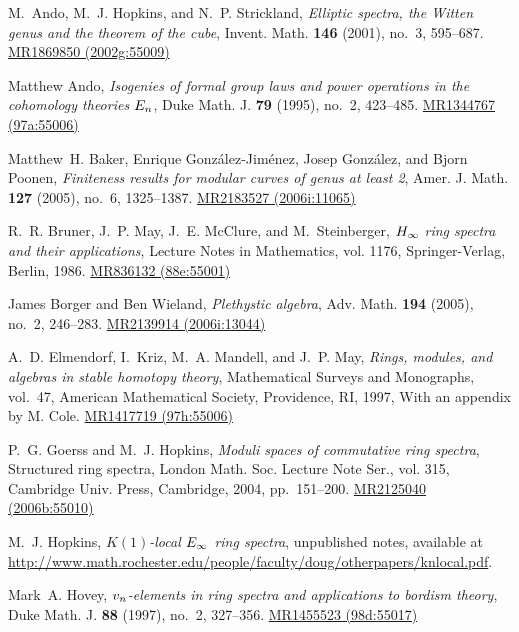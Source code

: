 \documentclass{gtpart}
\theoremstyle{definition}
\theoremstyle{remark}
\begin{document}
\newcommand{\MRn}[2]{\href{http://www.ams.org/mathscinet-getitem?mr=#1}{MR#1 #2}}
\begin{thebibliography}

M.~Ando, M.~J. Hopkins, and N.~P. Strickland, \emph{Elliptic spectra, the
  {W}itten genus and the theorem of the cube}, Invent. Math. \textbf{146}
  (2001), no.~3, 595--687. \MRn{1869850}{(2002g:55009)}

Matthew Ando, \emph{Isogenies of formal group laws and power operations in the
  cohomology theories {$E\sb n$}}, Duke Math. J. \textbf{79} (1995), no.~2,
  423--485. \MRn{1344767}{(97a:55006)}

Matthew~H. Baker, Enrique Gonz{\'a}lez-Jim{\'e}nez, Josep Gonz{\'a}lez, and
  Bjorn Poonen, \emph{Finiteness results for modular curves of genus at least
  2}, Amer. J. Math. \textbf{127} (2005), no.~6, 1325--1387. \MRn{2183527}{(2006i:11065)}

R.~R. Bruner, J.~P. May, J.~E. McClure, and M.~Steinberger, \emph{{$H\sb \infty
  $} ring spectra and their applications}, Lecture Notes in Mathematics, vol.
  1176, Springer-Verlag, Berlin, 1986. \MRn{836132}{(88e:55001)}

James Borger and Ben Wieland, \emph{Plethystic algebra}, Adv. Math.
  \textbf{194} (2005), no.~2, 246--283. \MRn{2139914}{(2006i:13044)}

A.~D. Elmendorf, I.~Kriz, M.~A. Mandell, and J.~P. May, \emph{Rings, modules,
  and algebras in stable homotopy theory}, Mathematical Surveys and Monographs,
  vol.~47, American Mathematical Society, Providence, RI, 1997, With an
  appendix by M. Cole. \MRn{1417719}{(97h:55006)}

P.~G. Goerss and M.~J. Hopkins, \emph{Moduli spaces of commutative ring
  spectra}, Structured ring spectra, London Math. Soc. Lecture Note Ser., vol.
  315, Cambridge Univ. Press, Cambridge, 2004, pp.~151--200. \MRn{2125040}{(2006b:55010)}

M.~J. Hopkins, \emph{{$K(1)$}-local {$E\sb \infty $} ring spectra}, unpublished
  notes, available at
  \href{http://www.math.rochester.edu/people/faculty/doug/otherpapers/knlocal.pdf}{http://www.math.rochester.edu/people/faculty/doug/otherpapers/knlocal.pdf}.

Mark~A. Hovey, \emph{{$v\sb n$}-elements in ring spectra and applications to
  bordism theory}, Duke Math. J. \textbf{88} (1997), no.~2, 327--356.
  \MRn{1455523}{(98d:55017)}


\end{thebibliography}
\end{document}
